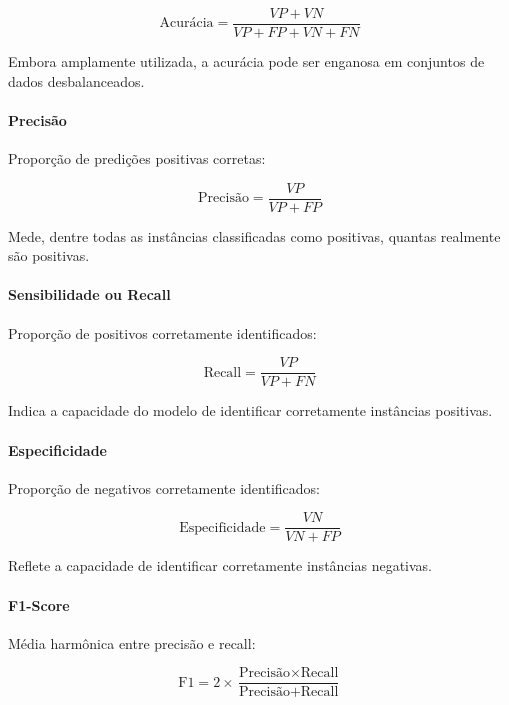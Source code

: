 \documentclass[12pt]{article}
\begin{document}
\begin{equation}
\text{Acurácia} = \frac{VP + VN}{VP + FP + VN + FN}
\end{equation}

Embora amplamente utilizada, a acurácia pode ser enganosa em conjuntos de dados desbalanceados.

\paragraph{Precisão} Proporção de predições positivas corretas:

\begin{equation}
\text{Precisão} = \frac{VP}{VP + FP}
\end{equation}

Mede, dentre todas as instâncias classificadas como positivas, quantas realmente são positivas.

\paragraph{Sensibilidade ou Recall} Proporção de positivos corretamente identificados:

\begin{equation}
\text{Recall} = \frac{VP}{VP + FN}
\end{equation}

Indica a capacidade do modelo de identificar corretamente instâncias positivas.

\paragraph{Especificidade} Proporção de negativos corretamente identificados:

\begin{equation}
\text{Especificidade} = \frac{VN}{VN + FP}
\end{equation}

Reflete a capacidade de identificar corretamente instâncias negativas.

\paragraph{F1-Score} Média harmônica entre precisão e recall:

\begin{equation}
\text{F1} = 2 \times \frac{\text{Precisão} \times \text{Recall}}{\text{Precisão} + \text{Recall}}
\end{equation}
\end{document}
